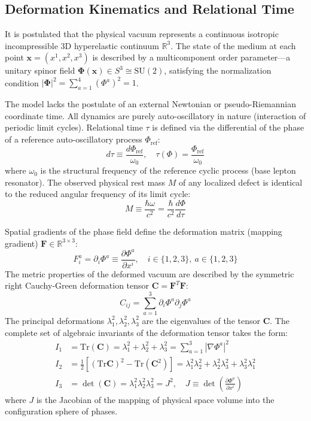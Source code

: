 \documentclass[12pt,a4paper]{article}
\begin{document}
	\subsection{Deformation Kinematics and Relational Time}
	It is postulated that the physical vacuum represents a continuous isotropic incompressible 3D hyperelastic continuum $\mathbb{R}^3$. The state of the medium at each point $\mathbf{x} = (x^1, x^2, x^3)$ is described by a multicomponent order parameter—a unitary spinor field $\boldsymbol{\Phi}(\mathbf{x}) \in S^3 \cong \mathrm{SU}(2)$, satisfying the normalization condition $|\boldsymbol{\Phi}|^2 = \sum_{a=1}^4 (\Phi^a)^2 = 1$.
	
	The model lacks the postulate of an external Newtonian or pseudo-Riemannian coordinate time. All dynamics are purely auto-oscillatory in nature (interaction of periodic limit cycles). Relational time $\tau$ is defined via the differential of the phase of a reference auto-oscillatory process $\Phi_{\text{ref}}$:
	\begin{equation}
		d\tau \equiv \frac{d\Phi_{\text{ref}}}{\omega_0}, \quad \tau(\Phi) = \frac{\Phi_{\text{ref}}}{\omega_0}
	\end{equation}
	where $\omega_0$ is the structural frequency of the reference cyclic process (base lepton resonator). The observed physical rest mass $M$ of any localized defect is identical to the reduced angular frequency of its limit cycle:
	\begin{equation}
		M \equiv \frac{\hbar \omega}{c^2} = \frac{\hbar}{c^2} \frac{d\Phi}{d\tau}
	\end{equation}
	
	Spatial gradients of the phase field define the deformation matrix (mapping gradient) $\mathbf{F} \in \mathbb{R}^{3 \times 3}$:
	\begin{equation}
		F_i^a = \partial_i \Phi^a \equiv \frac{\partial \Phi^a}{\partial x^i}, \quad i \in \{1,2,3\}, \ a \in \{1,2,3\}
	\end{equation}
	The metric properties of the deformed vacuum are described by the symmetric right Cauchy-Green deformation tensor $\mathbf{C} = \mathbf{F}^T \mathbf{F}$:
	\begin{equation}
		C_{ij} = \sum_{a=1}^3 \partial_i \Phi^a \partial_j \Phi^a
	\end{equation}
	The principal deformations $\lambda_1^2, \lambda_2^2, \lambda_3^2$ are the eigenvalues of the tensor $\mathbf{C}$. The complete set of algebraic invariants of the deformation tensor takes the form:
	\begin{align}
		I_1 &= \text{Tr}(\mathbf{C}) = \lambda_1^2 + \lambda_2^2 + \lambda_3^2 = \sum_{a=1}^3 |\nabla \Phi^a|^2 \\
		I_2 &= \frac{1}{2} \left[ (\text{Tr}\mathbf{C})^2 - \text{Tr}(\mathbf{C}^2) \right] = \lambda_1^2 \lambda_2^2 + \lambda_2^2 \lambda_3^2 + \lambda_3^2 \lambda_1^2 \\
		I_3 &= \det(\mathbf{C}) = \lambda_1^2 \lambda_2^2 \lambda_3^2 = J^2, \quad J \equiv \det\left(\frac{\partial \Phi^a}{\partial x^i}\right)
	\end{align}
	where $J$ is the Jacobian of the mapping of physical space volume into the configuration sphere of phases.
	
\end{document}
